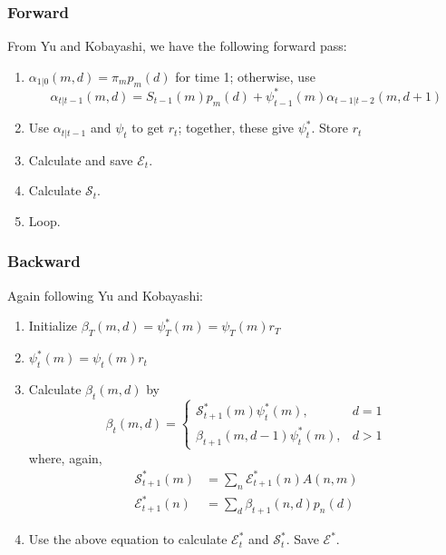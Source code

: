 \documentclass[11pt]{article}
\begin{document}
\subsubsection{Forward}
From Yu and Kobayashi, we have the following forward pass:
\begin{enumerate}
    \item $\alpha_{1|0}(m, d) = \pi_m p_m(d)$ for time 1; otherwise, use
    \begin{equation}
        \alpha_{t|t-1}(m, d) = S_{t-1}(m) p_m(d) + \psi^*_{t-1}(m) \alpha_{t-1|t-2}(m, d + 1)
    \end{equation}
    \item Use $\alpha_{t|t-1}$ and $\psi_t$ to get $r_t$; together, these give
    $\psi_t^*$. Store $r_t$
    \item Calculate and save $\mathcal{E}_t$.
    \item Calculate $\mathcal{S}_t$.
    \item Loop.
\end{enumerate}

\subsubsection{Backward}
Again following Yu and Kobayashi:
\begin{enumerate}
    \item Initialize $\beta_T(m, d) = \psi^*_T(m) = \psi_T(m) r_T$
    \item $\psi^*_t(m) = \psi_t(m) r_t$
    \item Calculate $\beta_t(m, d)$ by
    \begin{equation}
        \beta_t(m, d) =
        \begin{cases}
            \mathcal{S}^*_{t+1}(m)\psi^*_t(m), & d=1 \\
            \beta_{t+1}(m, d - 1) \psi^*_t(m), & d > 1
        \end{cases}
    \end{equation}
    where, again,
    \begin{align}
        \mathcal{S}^*_{t + 1}(m) &= \sum_{n} \mathcal{E}^*_{t+1}(n) A(n, m) \\
        \mathcal{E}^*_{t + 1}(n) &= \sum_d \beta_{t+1}(n, d) p_n(d)
    \end{align}
    \item Use the above equation to calculate $\mathcal{E}^*_t$ and $\mathcal{S}^*_t$. Save $\mathcal{E}^*$.
\end{enumerate}
\end{document}

